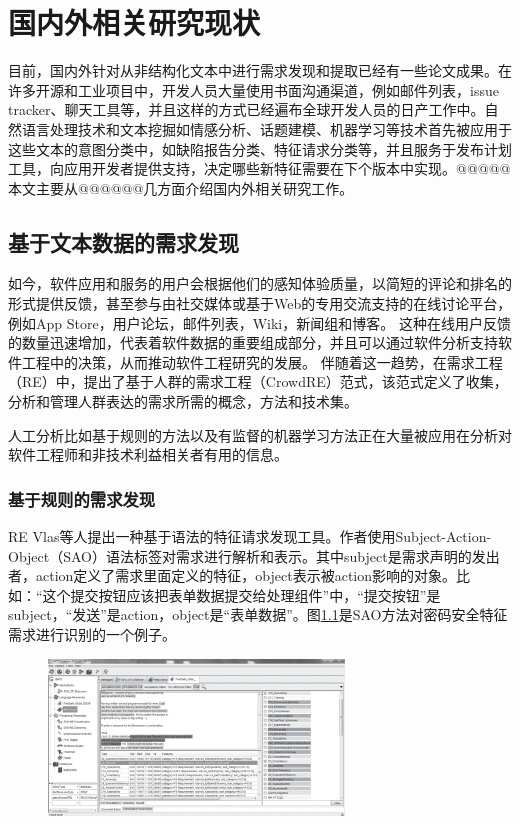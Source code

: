 \chapter{国内外相关研究现状}\label{chap:related_work}

目前，国内外针对从非结构化文本中进行需求发现和提取已经有一些论文成果。在许多开源和工业项目中，开发人员大量使用书面沟通渠道，例如邮件列表，issue tracker、聊天工具等，并且这样的方式已经遍布全球开发人员的日产工作中。自然语言处理技术和文本挖掘如情感分析、话题建模、机器学习等技术首先被应用于这些文本的意图分类中，如缺陷报告分类、特征请求分类等\cite{maalej2015bug}，并且服务于发布计划工具，向应用开发者提供支持，决定哪些新特征需要在下个版本中实现。@@@@@本文主要从@@@@@@几方面介绍国内外相关研究工作。

\section{基于文本数据的需求发现}
如今，软件应用和服务的用户会根据他们的感知体验质量，以简短的评论和排名的形式提供反馈，甚至参与由社交媒体或基于Web的专用交流支持的在线讨论平台，例如App Store，用户论坛，邮件列表，Wiki，新闻组和博客。 这种在线用户反馈的数量迅速增加，代表着软件数据的重要组成部分，并且可以通过软件分析支持软件工程中的决策，从而推动软件工程研究的发展\cite{Morales2019Speech}。 
伴随着这一趋势，在需求工程（RE）中，提出了基于人群的需求工程（CrowdRE）\cite{groen2017crowd}范式，该范式定义了收集，分析和管理人群表达的需求所需的概念，方法和技术集。

人工分析比如基于规则的方法以及有监督的机器学习方法正在大量被应用在分析对软件工程师和非技术利益相关者有用的信息\cite{Morales2019Speech}。
\subsection{基于规则的需求发现}

RE Vlas等人\cite{morales2014discovering}提出一种基于语法的特征请求发现工具。作者使用Subject-Action-Object（SAO）语法标签对需求进行解析和表示。其中subject是需求声明的发出者，action定义了需求里面定义的特征，object表示被action影响的对象。比如：“这个提交按钮应该把表单数据提交给处理组件”中，“提交按钮”是subject，“发送”是action，object是“表单数据”。图\ref{fig:sao}是SAO方法对密码安全特征需求进行识别的一个例子。
\begin{figure}[htbp]
    \centering
    \includegraphics[width=0.70\textwidth]{Img/sao.png}
    \label{fig:sao}
\end{figure}


